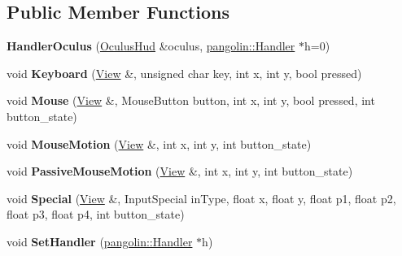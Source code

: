 \subsection*{Public Member Functions}
\begin{DoxyCompactItemize}
\item 
{\bfseries Handler\+Oculus} (\hyperlink{classpangolin_1_1_oculus_hud}{Oculus\+Hud} \&oculus, \hyperlink{structpangolin_1_1_handler}{pangolin\+::\+Handler} $\ast$h=0)\hypertarget{structpangolin_1_1_handler_oculus_ab95cd8d69641abfe6661827e8123dba6}{}\label{structpangolin_1_1_handler_oculus_ab95cd8d69641abfe6661827e8123dba6}

\item 
void {\bfseries Keyboard} (\hyperlink{structpangolin_1_1_view}{View} \&, unsigned char key, int x, int y, bool pressed)\hypertarget{structpangolin_1_1_handler_oculus_a14ebc557f794615fa359b26c7771270d}{}\label{structpangolin_1_1_handler_oculus_a14ebc557f794615fa359b26c7771270d}

\item 
void {\bfseries Mouse} (\hyperlink{structpangolin_1_1_view}{View} \&, Mouse\+Button button, int x, int y, bool pressed, int button\+\_\+state)\hypertarget{structpangolin_1_1_handler_oculus_adeb4c87012e2b6c64f1cc8d86037a9f7}{}\label{structpangolin_1_1_handler_oculus_adeb4c87012e2b6c64f1cc8d86037a9f7}

\item 
void {\bfseries Mouse\+Motion} (\hyperlink{structpangolin_1_1_view}{View} \&, int x, int y, int button\+\_\+state)\hypertarget{structpangolin_1_1_handler_oculus_ac5b7b0dcbceefe4bf9c2a316bbd84d62}{}\label{structpangolin_1_1_handler_oculus_ac5b7b0dcbceefe4bf9c2a316bbd84d62}

\item 
void {\bfseries Passive\+Mouse\+Motion} (\hyperlink{structpangolin_1_1_view}{View} \&, int x, int y, int button\+\_\+state)\hypertarget{structpangolin_1_1_handler_oculus_ae60996327ea6d7cffe824afc3a3d822b}{}\label{structpangolin_1_1_handler_oculus_ae60996327ea6d7cffe824afc3a3d822b}

\item 
void {\bfseries Special} (\hyperlink{structpangolin_1_1_view}{View} \&, Input\+Special in\+Type, float x, float y, float p1, float p2, float p3, float p4, int button\+\_\+state)\hypertarget{structpangolin_1_1_handler_oculus_aa5e15c10843162c074eb70a3fc572101}{}\label{structpangolin_1_1_handler_oculus_aa5e15c10843162c074eb70a3fc572101}

\item 
void {\bfseries Set\+Handler} (\hyperlink{structpangolin_1_1_handler}{pangolin\+::\+Handler} $\ast$h)\hypertarget{structpangolin_1_1_handler_oculus_a85249e6e636f10a700b1e653cd18d2aa}{}\label{structpangolin_1_1_handler_oculus_a85249e6e636f10a700b1e653cd18d2aa}

\end{DoxyCompactItemize}
